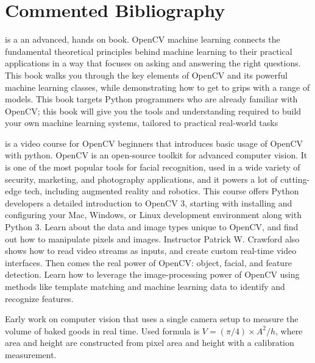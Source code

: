 \clearpage
\chapter*{Commented Bibliography}

\newcommand{\parstartcite}[1]{\textbf{\citeauthor{#1}} \textsf{\citetitle{#1}} \newline}

\parstartcite{beyeler2017opencvml} is a an advanced, hands on book.
OpenCV machine learning connects the fundamental theoretical principles
behind machine learning to their practical applications in a way that focuses
on asking and answering the right questions.
This book walks you through the key elements of OpenCV
and its powerful machine learning classes,
while demonstrating how to get to grips with a range of models.
This book targets Python programmers who are already familiar with OpenCV;
this book will give you the tools and understanding required to build your
own machine learning systems, tailored to practical real-world tasks

\parstartcite{crawford2017opencvpythonvideo} is a video course for OpenCV beginners that introduces basic usage of OpenCV with python.
OpenCV is an open-source toolkit for advanced computer vision.
It is one of the most popular tools for facial recognition,
used in a wide variety of security, marketing, and photography applications,
and it powers a lot of cutting-edge tech, including augmented reality
and robotics. This course offers Python developers a detailed introduction to
OpenCV 3, starting with installing and configuring your Mac, Windows,
or Linux development environment along with Python 3.
Learn about the data and image types unique to OpenCV, and find out how to
manipulate pixels and images. Instructor Patrick W. Crawford also shows how
to read video streams as inputs, and create custom real-time video interfaces.
Then comes the real power of OpenCV: object, facial, and feature detection.
Learn how to leverage the image-processing power of OpenCV using methods like
template matching and machine learning data to identify and recognize features.

\parstartcite{rusu2011pointcloud}

\parstartcite{levine1989microwave}
Early work on computer vision that uses a single camera setup to measure the volume of baked goods in real time. Used formula is $V = (\pi/4) \times A^2/h$, where area and height are constructed from pixel area and height with a calibration measurement.


